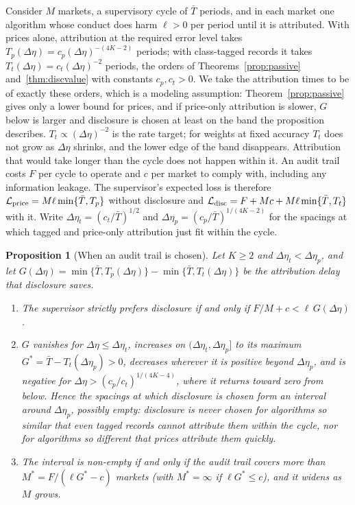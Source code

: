 \documentclass[12pt]{article}
\newtheorem{proposition}[theorem]{Proposition}
\theoremstyle{definition}
\theoremstyle{remark}
\begin{document}
Consider $M$ markets, a supervisory cycle of $\bar T$ periods, and in each market one algorithm whose conduct does harm $\ell>0$ per period until it is attributed. With prices alone, attribution at the required error level takes $T_p(\Delta\eta)=c_p(\Delta\eta)^{-(4K-2)}$ periods; with class-tagged records it takes $T_t(\Delta\eta)=c_t(\Delta\eta)^{-2}$ periods, the orders of Theorems~\ref{prop:passive} and~\ref{thm:discvalue} with constants $c_p,c_t>0$. We take the attribution times to be of exactly these orders, which is a modeling assumption: Theorem~\ref{prop:passive} gives only a lower bound for prices, and if price-only attribution is slower, $G$ below is larger and disclosure is chosen at least on the band the proposition describes. $T_t\propto(\Delta\eta)^{-2}$ is the rate target; for weights at fixed accuracy $T_t$ does not grow as $\Delta\eta$ shrinks, and the lower edge of the band disappears. Attribution that would take longer than the cycle does not happen within it. An audit trail costs $F$ per cycle to operate and $c$ per market to comply with, including any information leakage. The supervisor's expected loss is therefore $\mathcal L_{\rm price}=M\ell\min\{\bar T,T_p\}$ without disclosure and $\mathcal L_{\rm disc}=F+Mc+M\ell\min\{\bar T,T_t\}$ with it. Write $\Delta\eta_t=(c_t/\bar T)^{1/2}$ and $\Delta\eta_p=(c_p/\bar T)^{1/(4K-2)}$ for the spacings at which tagged and price-only attribution just fit within the cycle.

\begin{proposition}[When an audit trail is chosen]\label{prop:choice}
Let $K\ge2$ and $\Delta\eta_t<\Delta\eta_p$, and let $G(\Delta\eta)=\min\{\bar T,T_p(\Delta\eta)\}-\min\{\bar T,T_t(\Delta\eta)\}$ be the attribution delay that disclosure saves.
\begin{enumerate}[label=(\roman*),itemsep=1pt]
\item The supervisor strictly prefers disclosure if and only if $F/M+c<\ell\,G(\Delta\eta)$.
\item $G$ vanishes for $\Delta\eta\le\Delta\eta_t$, increases on $(\Delta\eta_t,\Delta\eta_p]$ to its maximum $G^*=\bar T-T_t(\Delta\eta_p)>0$, decreases wherever it is positive beyond $\Delta\eta_p$, and is negative for $\Delta\eta>(c_p/c_t)^{1/(4K-4)}$, where it returns toward zero from below. Hence the spacings at which disclosure is chosen form an interval around $\Delta\eta_p$, possibly empty: disclosure is never chosen for algorithms so similar that even tagged records cannot attribute them within the cycle, nor for algorithms so different that prices attribute them quickly.
\item The interval is non-empty if and only if the audit trail covers more than $M^*=F/(\ell G^*-c)$ markets (with $M^*=\infty$ if $\ell G^*\le c$), and it widens as $M$ grows.
\end{enumerate}
\end{proposition}
\end{document}
